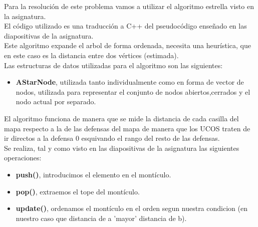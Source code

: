 Para la resolución de este problema vamos a utilizar el algoritmo estrella visto en la asignatura.
\\
El código utilizado es una traducción a C++ del pseudocódigo enseñado en las diapositivas de la asignatura.
\\
Este algoritmo expande el arbol de forma ordenada, necesita una heurística, que en este caso es la distancia entre dos vértices (estimada).
\\
Las estructuras de datos utilizadas para el algoritmo son las siguientes:
\begin{itemize}
    \item \textbf{AStarNode}, utilizada tanto individualmente como en forma de vector de nodos, utilizada para representar el conjunto de nodos abiertos,cerrados y el nodo actual por separado.
\end{itemize}
El algoritmo funciona de manera que se mide la distancia de cada casilla del mapa respecto a la de las defensas del mapa de manera que los UCOS traten de ir directos a la defensa 0 esquivando el rango del resto de las defensas.
\\
Se realiza, tal y como visto en las diapositivas de la asignatura las siguientes operaciones:
\begin{itemize}
    \item \textbf{push()}, introducimos el elemento en el montículo.
    \item \textbf{pop()}, extraemos el tope del montículo.
    \item \textbf{update()}, ordenamos el montículo en el orden segun nuestra condicion (en nuestro caso que distancia de a 'mayor' distancia de b).
\end{itemize}
